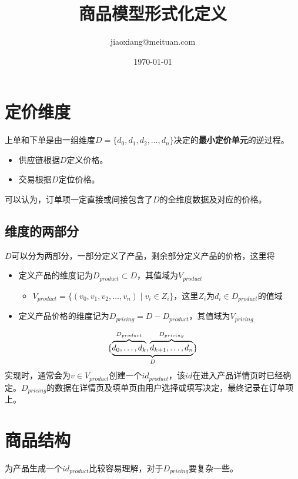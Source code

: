 \documentclass[a4paper]{article}
\title{商品模型形式化定义}
\author{jiaoxiang@meituan.com}
\date{\today}
\begin{document}
 
\maketitle

\section{定价维度}
上单和下单是由一组维度$D=\{d_0, d_1, d_2,\ldots, d_n\}$决定的\textbf{最小定价单元}的逆过程。
\begin{itemize} 
    \item 供应链根据$D$定义价格。
    \item 交易根据$D$定位价格。
\end{itemize}
可以认为，订单项一定直接或间接包含了$D$的全维度数据及对应的价格。

\subsection{维度的两部分}
$D$可以分为两部分，一部分定义了产品，剩余部分定义产品的价格，这里将
\begin{itemize}
    \item 定义产品的维度记为$D_{product} \subset D$，其值域为$V_{product}$
    \begin{itemize}
        \item $V_{product} = \{(v_0, v_1, v_2, \ldots, v_n) \mid v_i \in Z_i\}$，这里$Z_i$为$d_i \in D_{product}$的值域
    \end{itemize}
    \item 定义产品价格的维度记为$D_{pricing} = D - D_{product}$，其值域为$V_{pricing}$
\end{itemize}
\begin{equation}
    \{\underbrace{%
        \overbrace{\mathstrut d_0,\ldots,d_k}^{D_{product}},
        \overbrace{\mathstrut d_{k+1},\ldots,d_n}^{D_{pricing}}}
    _{D} \}
\end{equation}
实现时，通常会为$v \in V_{product}$创建一个$id_{product}$，该$id$在进入产品详情页时已经确定。$D_{pricing}$的数据在详情页及填单页由用户选择或填写决定，最终记录在订单项上。

\section{商品结构}
为产品生成一个$id_{product}$比较容易理解，对于$D_{pricing}$要复杂一些。
\end{document}
